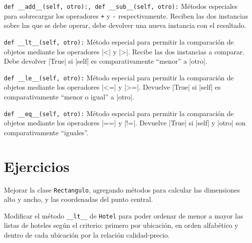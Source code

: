 \begin{referencia_python}
\begin{sintaxis}{\lstinline!def __add__(self, otro):, def __sub__(self, otro):!}
Métodos especiales para sobrecargar los operadores \lstinline!+! y
\lstinline!-! respectivamente.  Reciben las dos instancias sobre las
que se debe operar, debe devolver una nueva instancia con el
resultado.
\end{sintaxis}

\begin{sintaxis}{\lstinline!def __lt__(self, otro):!}
Método especial para permitir la comparación de objetos mediante los
operadores |<| y |>|.  Recibe las dos instancias a
comparar. Debe devolver |True| si |self| es comparativamente
\enquote{menor} a |otro|.
\end{sintaxis}

\begin{sintaxis}{\lstinline!def __le__(self, otro):!}
Método especial para permitir la comparación de objetos mediante los
operadores |<=| y |>=|. Devuelve |True| si |self| es comparativamente
\enquote{menor o igual} a |otro|.
\end{sintaxis}

\begin{sintaxis}{\lstinline!def __eq__(self, otro):!}
Método especial para permitir la comparación de objetos mediante los operadores
|==| y |!=|. Devuelve |True| si |self| y |otro| son comparativamente
\enquote{iguales}.
\end{sintaxis}

\end{referencia_python}

\newpage
\section{Ejercicios}

\begin{ejercicio}
Mejorar la clase \lstinline|Rectangulo|, agregando métodos para calcular las
dimensiones alto y ancho, y las coordenadas del punto central.
\end{ejercicio}


\begin{ejercicio}
Modificar el método \lstinline!__lt__! de \lstinline!Hotel!
para poder ordenar de menor a mayor las listas de hoteles según el criterio:
primero por ubicación, en orden alfabético y dentro de cada ubicación por
la relación calidad-precio.
\end{ejercicio}


